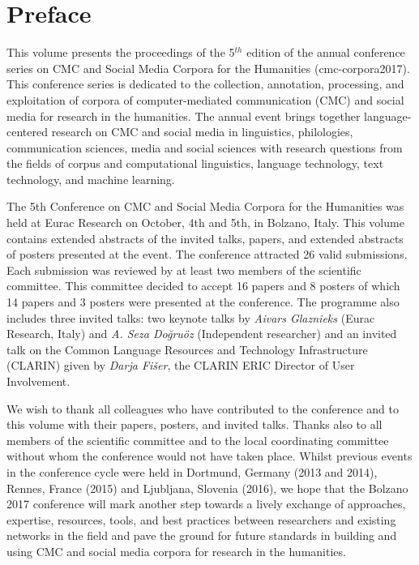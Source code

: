 \documentclass[usegeometry]{scrbook}
\begin{document}
\vfill

\noindent\colophon

\smallskip

\doclicenseThis
\thispagestyle{empty}
\clearpage


\chapter*{Preface}
{}
This volume presents the proceedings of the 5{$^{th}$} edition of the annual conference series on CMC and Social Media Corpora for the Humanities (cmc-corpora2017). This conference series is dedicated to the collection, annotation, processing, and exploitation of corpora of computer-mediated communication (CMC) and social media for research in the humanities. The annual event brings together language-centered research on CMC and social media in linguistics, philologies, communication sciences, media and social sciences with research questions from the fields of corpus and computational linguistics, language technology, text technology, and machine learning.

The 5th Conference on CMC and Social Media Corpora for the Humanities was held at Eurac Research on October, 4th and 5th, in Bolzano, Italy. This volume contains extended abstracts of the invited talks, papers, and extended abstracts of posters presented at the event. The conference attracted 26 valid submissions. Each submission was reviewed by at least two members of the scientific committee. This committee decided to accept 16 papers and 8 posters of which 14 papers and 3 posters were presented at the conference. The programme also includes three invited talks: two keynote talks by \textit{Aivars Glaznieks} (Eurac Research, Italy) and \textit{A. Seza Do\u{g}ru\"oz} (Independent researcher) and an invited talk on the Common Language Resources and Technology Infrastructure (CLARIN) given by \textit{Darja Fi\v{s}er}, the CLARIN ERIC Director of User Involvement.

We wish to thank all colleagues who have contributed to the conference and to this volume with their papers, posters, and invited talks. Thanks also to all members of the scientific committee and to the local coordinating committee without whom the conference would not have taken place. Whilst previous events in the conference cycle were held in Dortmund, Germany (2013 and 2014), Rennes, France (2015) and Ljubljana, Slovenia (2016), we hope that the Bolzano 2017 conference will mark another step towards a lively exchange of approaches, expertise, resources, tools, and best practices between researchers and existing networks in the field and pave the ground for future standards in building and using CMC and social media corpora for research in the humanities.
\end{document}
